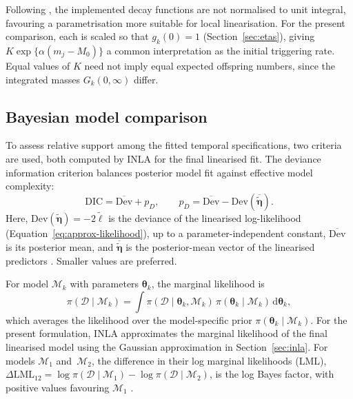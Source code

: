 \documentclass{statsmsc}
\begin{document}
Following \citet{serafini2023approximation}, the implemented decay functions are not normalised to unit integral, favouring a parametrisation more suitable for local linearisation. For the present comparison, each is scaled so that $g_k(0) = 1$ (Section~\ref{sec:etas}), giving $K\exp\{\alpha(m_j-M_0)\}$ a common interpretation as the initial triggering rate. Equal values of $K$ need not imply equal expected offspring numbers, since the integrated masses $G_k(0,\infty)$ differ.  

\subsection{Bayesian model comparison} \label{sec:model-comparison}

To assess relative support among the fitted temporal specifications, two criteria are used, both computed by INLA for the final linearised fit. The deviance information criterion \citep[DIC;][]{spiegelhalter2002bayesian} balances posterior model fit against effective model complexity:
\begin{equation*}
\mathrm{DIC} = \overline{\mathrm{Dev}}+p_D, \qquad
p_D = \overline{\mathrm{Dev}} - \mathrm{Dev}(\overline{\widetilde{\boldsymbol{\eta}}}).
\end{equation*}
Here, $\mathrm{Dev}(\widetilde{\boldsymbol{\eta}}) = -2\widetilde{\ell}$ is the deviance of the linearised log-likelihood (Equation~\eqref{eq:approx-likelihood}), up to a parameter-independent constant, $\overline{\mathrm{Dev}}$ is its posterior mean, and $\overline{\widetilde{\boldsymbol{\eta}}}$ is the posterior-mean vector of the linearised predictors \citep{rue2009approximate}. Smaller values are preferred.

For model $\mathcal{M}_k$ with parameters $\boldsymbol{\theta}_k$, the marginal likelihood is 
\begin{equation*}
\pi(\mathcal{D} \mid \mathcal{M}_k) = \int \pi(\mathcal{D} \mid \boldsymbol{\theta}_k, \mathcal{M}_k) \, \pi(\boldsymbol{\theta}_k \mid \mathcal{M}_k) \,\mathrm{d}\boldsymbol{\theta}_k,
\end{equation*}
which averages the likelihood over the model-specific prior $\pi(\boldsymbol{\theta}_k \mid \mathcal{M}_k)$. For the present formulation, INLA approximates the marginal likelihood of the final linearised model using the Gaussian approximation in Section~\ref{sec:inla}. For models $\mathcal{M}_1$ and~$\mathcal{M}_2$, the difference in their log marginal likelihoods (LML), $\Delta\mathrm{LML}_{12} = \log \pi(\mathcal D\mid\mathcal{M}_1)-\log \pi(\mathcal D\mid \mathcal{M}_2)$, is the log Bayes factor, with positive values favouring $\mathcal{M}_1$ \citep{kass1995bayes}. 
\end{document}
